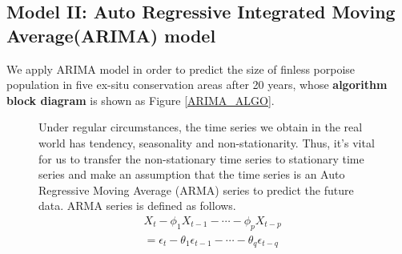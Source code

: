 \documentclass{mcmthesis}
\numberwithin{figure}{section}
\numberwithin{table}{section}
\numberwithin{equation}{section}
\begin{document}
\subsection{Model II: Auto Regressive Integrated Moving Average(ARIMA) model}
We apply ARIMA model in order to predict the size of finless porpoise population in five ex-situ 
conservation areas after 20 years, whose \textbf{algorithm block diagram} 
is shown as Figure \ref{ARIMA_ALGO}.
\par
\begin{figure}[ht]
\begin{minipage}[htbp]{0.35\linewidth}
  Under regular circumstances, the time series we obtain in the real world
  has tendency, seasonality and non-stationarity. Thus, it's vital for 
  us to transfer the non-stationary time series to stationary time series and 
  make an assumption that the time series is an Auto Regressive Moving Average
  (ARMA) series to predict the future data.  ARMA series is defined as follows.
  \begin{align*}
    &X_t-\phi_1X_{t-1}-\cdots -\phi_pX_{t-p} \\
    &= \epsilon_t - \theta_1\epsilon_{t-1}-\cdots-\theta_q\epsilon_{t-q}
  \end{align*}
 

\end{minipage}
\end{figure}
\end{document}

